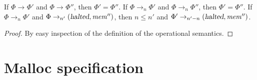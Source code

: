 \documentclass[a4paper]{article}
\newcommand{\var}[1]{\mathit{#1}}
\newcommand{\hs}{\var{ms}}
\newcommand{\mem}{\var{mem}}
\newcommand{\adv}{\var{adv}}
\newcommand{\halted}{\textsl{halted}}
\newcommand{\codelabel}[1]{\mathit{#1}}
\newcommand{\malloc}{\codelabel{malloc}}
\newcommand{\step}[1][]{\rightarrow_{#1}}
\begin{document}
\begin{lemma}[Determinacy]
  \label{lem:determinacy}
  If $\Phi \step \Phi'$ and $\Phi \step \Phi''$, then $\Phi' = \Phi''$.
  If $\Phi \step[n] \Phi'$ and $\Phi \step[n] \Phi''$, then $\Phi' = \Phi''$.
  If $\Phi \step[n] \Phi'$ and $\Phi \step[n'] (\halted,\mem'')$, then $n \leq n'$
  and $\Phi' \step[n'-n] (\halted,\mem'')$.
\end{lemma}
\begin{proof}
  By easy inspection of the definition of the operational semantics.
\end{proof}

\section{Malloc specification}
\newcommand{\hsfoot}{\hs_\var{footprint}}
\newcommand{\hsframe}{\hs_\var{frame}}
\newcommand{\size}{\var{size}}
\newcommand{\rio}{r_{io}}
\newcommand{\advb}{\var{adv_{base}}}
\newcommand{\adve}{\var{adv_{end}}}
\newcommand{\initb}{\var{init}_{base}}
\newcommand{\inite}{\var{init}_{end}}
\newcommand{\mrlen}{5cm}
\newcommand{\retm}{\var{ret}_{\malloc}}
\newcommand{\reta}{\var{ret}_{\adv}}
\newcommand{\base}{\var{base}}
\newcommand{\eend}{\var{end}}
\newcommand{\bracket}[1]{\multirow{#1}{*}{\ensuremath{
      \left . \vphantom{\begin{array}{l}
                          \ifthenelse{\equal{#1}{1}}{3\\}{
                          \ifthenelse{\equal{#1}{2}}{3\\3\\}{
                          \ifthenelse{\equal{#1}{3}}{3\\3\\3\\}{
                          \ifthenelse{\equal{#1}{4}}{3\\3\\3\\3\\}{
                          \ifthenelse{\equal{#1}{5}}{3\\3\\3\\3\\3\\}{
                          \ifthenelse{\equal{#1}{6}}{3\\3\\3\\3\\3\\3\\}{
                          3\\3\\3\\3\\3\\3\\3\\ %
                          }}}}}}
                        \end{array}} \right \}}}
              }
\newcommand{\annotate}[2]{\multirow{#1}{\mrlen}{\scriptsize #2}}
\end{document}
